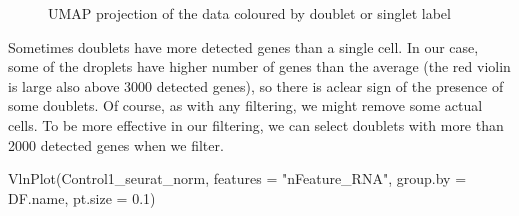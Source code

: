 \documentclass[
  letterpaper,
  DIV=11,
  numbers=noendperiod]{scrartcl}
\newenvironment{Shaded}{}{}
\newcommand{\AttributeTok}[1]{\textcolor[rgb]{0.49,0.56,0.16}{#1}}
\newcommand{\FloatTok}[1]{\textcolor[rgb]{0.25,0.63,0.44}{#1}}
\newcommand{\FunctionTok}[1]{\textcolor[rgb]{0.02,0.16,0.49}{#1}}
\newcommand{\NormalTok}[1]{#1}
\newcommand{\StringTok}[1]{\textcolor[rgb]{0.25,0.44,0.63}{#1}}
\begin{document}
\begin{figure}[H]


\caption{\label{fig-doublets}UMAP projection of the data coloured by
doublet or singlet label}

\end{figure}%

Sometimes doublets have more detected genes than a single cell. In our
case, some of the droplets have higher number of genes than the average
(the red violin is large also above 3000 detected genes), so there is
aclear sign of the presence of some doublets. Of course, as with any
filtering, we might remove some actual cells. To be more effective in
our filtering, we can select doublets with more than 2000 detected genes
when we filter.

\begin{Shaded}
\begin{Highlighting}[]
\FunctionTok{VlnPlot}\NormalTok{(Control1\_seurat\_norm, }\AttributeTok{features =} \StringTok{"nFeature\_RNA"}\NormalTok{, }\AttributeTok{group.by =}\NormalTok{ DF.name, }\AttributeTok{pt.size =} \FloatTok{0.1}\NormalTok{)}
\end{Highlighting}
\end{Shaded}
\end{document}
